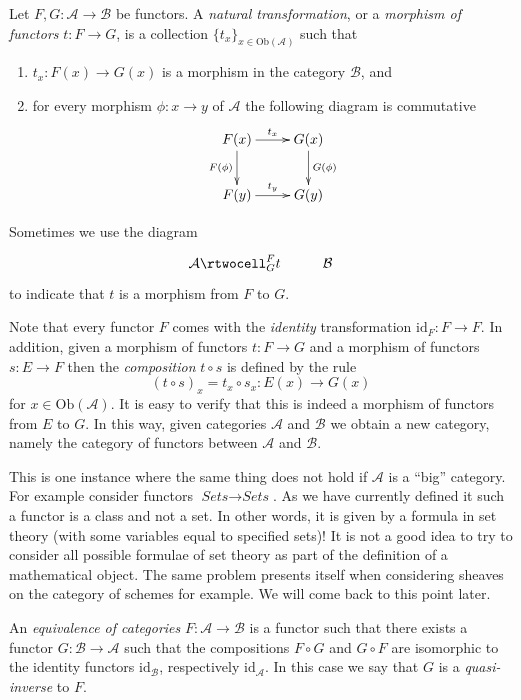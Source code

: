 \begin{definition}
\label{definition-transformation-functors}
Let $F, G : \mathcal{A} \to \mathcal{B}$ be functors.
A {\it natural transformation}, or a {\it morphism of functors}
$t : F \to G$, is a collection $\{t_x\}_{x\in \text{Ob}(\mathcal{A})}$
such that
\begin{enumerate}
\item $t_x : F(x) \to G(x)$ is a morphism in the category $\mathcal{B}$, and
\item for every morphism $\phi : x \to y$ of $\mathcal{A}$ the following
diagram is commutative
$$
\xymatrix{
F(x) \ar[r]^{t_x} \ar[d]_{F(\phi)} & G(x) \ar[d]^{G(\phi)} \\
F(y) \ar[r]^{t_y} & G(y) }
$$
\end{enumerate}
\end{definition}

\noindent
Sometimes we use the diagram
$$
\xymatrix{
\mathcal{A}
\rtwocell^F_{G}{t}
&
\mathcal{B}
}
$$
to indicate that $t$ is a morphism from $F$ to $G$.

\medskip\noindent
Note that every functor $F$ comes with the {\it identity} transformation
$\text{id}_F : F \to F$. In addition, given a morphism of
functors $t : F \to G$ and a morphism of functors $s : E \to F$
then the {\it composition} $t \circ s$ is defined by the rule
$$
(t \circ s)_x = t_x \circ s_x : E(x) \to G(x)
$$
for $x \in \text{Ob}(\mathcal{A})$.
It is easy to verify that this is indeed a morphism of functors
from $E$ to $G$.
In this way, given categories
$\mathcal{A}$ and $\mathcal{B}$ we obtain a new category,
namely the category of functors between $\mathcal{A}$ and
$\mathcal{B}$.

\begin{remark}
\label{remark-functors-sets-sets}
This is one instance where the same thing does not hold if
$\mathcal{A}$ is a ``big'' category. For example consider
functors $\textit{Sets} \to \textit{Sets}$. As we have currently
defined it such a functor is a class and not a set. In other
words, it is given by a formula in set theory (with some variables
equal to specified sets)! It is not a good idea to try to consider
all possible formulae of set theory as part of the definition of
a mathematical object. The same problem presents itself when
considering sheaves on the category of schemes for example.
We will come back to this point later.
\end{remark}

\begin{definition}
\label{definition-equivalence-categories}
An {\it equivalence of categories}
$F : \mathcal{A} \to \mathcal{B}$ is a functor such that there
exists a functor $G : \mathcal{B} \to \mathcal{A}$ such that
the compositions $F \circ G$ and $G \circ F$ are isomorphic to the
identity functors $\text{id}_\mathcal{B}$,
respectively $\text{id}_\mathcal{A}$.
In this case we say that $G$ is a {\it quasi-inverse} to $F$.
\end{definition}

